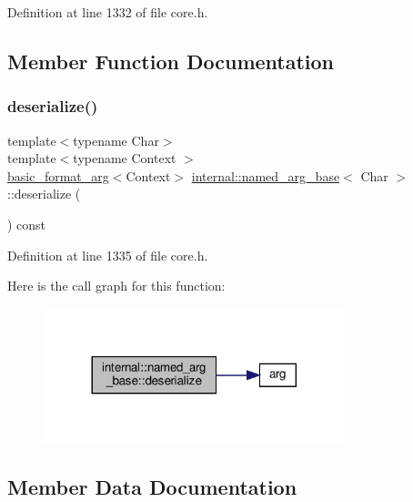 Definition at line 1332 of file core.\+h.



\subsection{Member Function Documentation}
\mbox{\label{structinternal_1_1named__arg__base_ac9c635fcb1ecc29ef4aacfb73c870292}} 
\subsubsection{\texorpdfstring{deserialize()}{deserialize()}}
{\footnotesize\ttfamily template$<$typename Char$>$ \\
template$<$typename Context $>$ \\
\hyperlink{classbasic__format__arg}{basic\+\_\+format\+\_\+arg}$<$Context$>$ \hyperlink{structinternal_1_1named__arg__base}{internal\+::named\+\_\+arg\+\_\+base}$<$ Char $>$\+::deserialize (\begin{DoxyParamCaption}{ }\end{DoxyParamCaption}) const\hspace{0.3cm}{\ttfamily [inline]}}



Definition at line 1335 of file core.\+h.

Here is the call graph for this function\+:
\nopagebreak
\begin{figure}[H]
\begin{center}
\leavevmode
\includegraphics[width=248pt]{structinternal_1_1named__arg__base_ac9c635fcb1ecc29ef4aacfb73c870292_cgraph}
\end{center}
\end{figure}


\subsection{Member Data Documentation}
\mbox{\label{structinternal_1_1named__arg__base_a739cb7625a031b68ca059d7f491f6270}} 
